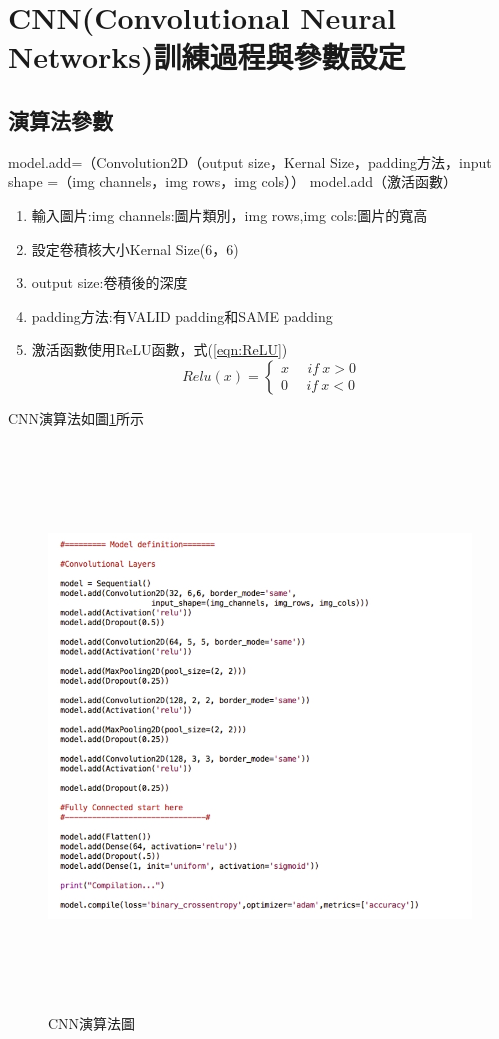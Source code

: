 \section{CNN(Convolutional Neural Networks)訓練過程與參數設定}
\subsection{演算法參數}
model.add=（Convolution2D（output size，Kernal Size，padding方法，input shape =（img channels，img rows，img cols））
model.add（激活函數）
\begin{enumerate}
	\item
	      輸入圖片:img channels:圖片類別，img rows,img cols:圖片的寬高
	\item
	      設定卷積核大小Kernal Size(6，6)
	\item
	      output size:卷積後的深度
	\item
	      padding方法:有VALID padding和SAME padding
	\item
	      激活函數使用ReLU函數，式(\ref{eqn:ReLU})
	      \begin{equation}
		      \label{eqn:ReLU}
		      Relu(x)=
		      \left\{\begin{matrix}
			      x \ \ \ \ \ \ if\ x>0
			      \\
			      0 \ \ \ \ \ \ if\ x<0
		      \end{matrix}\right.
	      \end{equation}
\end{enumerate}
CNN演算法如圖\ref{fig:Keras}所示
\begin{figure}[H]
	\centerline{\includegraphics[height=15cm]{pic/Keras.jpg}}
	\caption{CNN演算法圖}
	\label{fig:Keras}
\end{figure}

